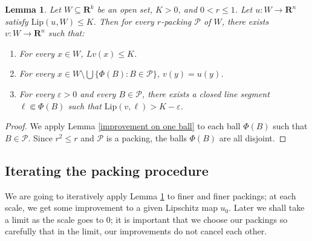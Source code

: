 \documentclass[reqno,11pt]{amsart}
\newcommand{\RR}{\mathbf{R}}
\newcommand{\Lip}{\mathrm{Lip}}
\newtheorem{lemma}[theorem]{Lemma}
\theoremstyle{definition}
\numberwithin{equation}{section}
\begin{document}
\begin{lemma}\label{improvement on packing}
Let $W \subseteq \RR^k$ be an open set, $K > 0$, and $0 < r \leq 1$.
Let $u: W \to \RR^n$ satisfy $\Lip(u, W) \leq K$.
Then for every $r$-packing $\mathscr P$ of $W$, there exists $v: W \to \RR^n$ such that:
\begin{enumerate}
\item For every $x \in W$, $Lv(x) \leq K$.
\item For every $x \in W \setminus \bigcup \{\Phi(B): B \in \mathscr P\}$, $v(y) = u(y)$.
\item For every $\varepsilon > 0$ and every $B \in \mathscr P$, there exists a closed line segment $\ell \Subset \Phi(B)$ such that $\Lip(v, \ell) > K - \varepsilon$.
\end{enumerate}
\end{lemma}
\begin{proof}
We apply Lemma \ref{improvement on one ball} to each ball $\Phi(B)$ such that $B \in \mathscr P$.
Since $r^2 \leq r$ and $\mathscr P$ is a packing, the balls $\Phi(B)$ are all disjoint.
\end{proof}

\subsection{Iterating the packing procedure}
We are going to iteratively apply Lemma \ref{improvement on packing} to finer and finer packings; at each scale, we get some improvement to a given Lipschitz map $u_0$.
Later we shall take a limit as the scale goes to $0$; it is important that we choose our packings so carefully that in the limit, our improvements do not cancel each other.
\end{document}
